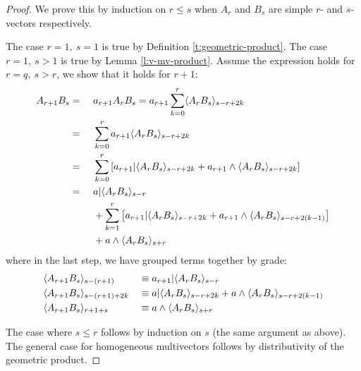 \begin{proof}
	We prove this by induction on $r \leq s$ when $A_r$ and $B_s$ are simple $r$- and $s$-vectors respectively.

	The case $r=1,\ s=1$ is true by Definition \ref{t:geometric-product}.
	The case $r=1,\ s>1$ is true by Lemma \ref{l:v-mv-product}.
	Assume the expression holds for $r = q,\ s > r$, we show that it holds for $r+1$:
	\begin{alignat*}{2}
		A_{r+1}B_s &=\ &&a_{r+1}A_rB_s = a_{r+1}\sum_{k=0}^r \langle A_rB_s \rangle_{s-r+2k} \\
				   &= &&\sum_{k=0}^r a_{r+1}\langle A_rB_s \rangle_{s-r+2k} \\
				   &= &&\sum_{k=0}^r \left[a_{r+1} | \langle A_rB_s \rangle_{s-r+2k} + a_{r+1} \wedge \langle A_rB_s \rangle_{s-r+2k}\right]\\
				   &=\ &&a | \langle A_rB_s \rangle_{s-r} \\
				   &  &&+ \sum_{k=1}^r \left[a_{r+1} | \langle A_rB_s \rangle_{s-r+2k} + a_{r+1} \wedge \langle A_rB_s \rangle_{s-r+2(k-1)}\right]\\
				   &  &&+ a\wedge \langle A_rB_s \rangle_{s+r}
	\end{alignat*}
	where in the last step, we have grouped terms together by grade:
	\begin{alignat*}{2}
		&\langle A_{r+1}B_s \rangle_{s-(r+1)} &&\equiv a_{r+1} | \langle A_rB_s \rangle_{s-r} \\
		&\langle A_{r+1}B_s \rangle_{s-(r+1)+2k} &&\equiv a | \langle A_rB_s \rangle_{s-r+2k} + a \wedge \langle A_rB_s \rangle_{s-r+2(k-1)} \\
		&\langle A_{r+1}B_s \rangle_{r+1+s} &&\equiv a \wedge \langle A_rB_s \rangle_{s+r}
	\end{alignat*}

	The case where $s \leq r$ follows by induction on $s$ (the same argument as above).
	The general case for homogeneous multivectors follows by distributivity of the geometric product.
\end{proof}
